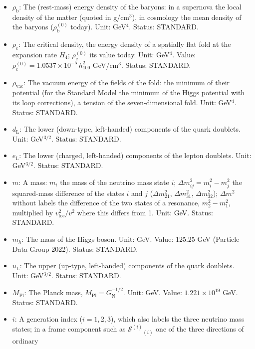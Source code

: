 \documentclass[
  10pt,
]{article}
\begin{document}
\begin{itemize}
  (Planck 2018). Status: DERIVED.
\item
  \(\rho_{\mathrm{b}}\): The (rest-mass) energy density of the baryons:
  in a supernova the local density of the matter (quoted in g/cm\(^3\)),
  in cosmology the mean density of the baryons
  (\(\rho_{\mathrm{b}}^{(0)}\) today). Unit: GeV\(^4\). Status:
  STANDARD.
\item
  \(\rho_{\mathrm{c}}\): The critical density, the energy density of a
  spatially flat fold at the expansion rate \(H_4\);
  \(\rho_{\mathrm{c}}^{(0)}\) its value today. Unit: GeV\(^4\). Value:
  \(\rho_{\mathrm{c}}^{(0)} = 1.0537\times10^{-5}\,h_{100}^2\)
  GeV/cm\(^3\). Status: STANDARD.
\item
  \(\rho_{\mathrm{vac}}\): The vacuum energy of the fields of the fold:
  the minimum of their potential (for the Standard Model the minimum of
  the Higgs potential with its loop corrections), a tension of the
  seven-dimensional fold. Unit: GeV\(^4\). Status: STANDARD.
\item
  \(d_{\mathrm{L}}\): The lower (down-type, left-handed) components of
  the quark doublets. Unit: GeV\(^{3/2}\). Status: STANDARD.
\item
  \(e_{\mathrm{L}}\): The lower (charged, left-handed) components of the
  lepton doublets. Unit: GeV\(^{3/2}\). Status: STANDARD.
\item
  \(m\): A mass: \(m_i\) the mass of the neutrino mass state \(i\);
  \(\Delta m_{ij}^2 = m_i^2 - m_j^2\) the squared-mass difference of the
  states \(i\) and \(j\) (\(\Delta m_{21}^2\), \(\Delta m_{31}^2\),
  \(\Delta m_{32}^2\)); \(\Delta m^2\) without labels the difference of
  the two states of a resonance, \(m_2^2 - m_1^2\), multiplied by
  \(v_{\mathrm{loc}}^2/v^2\) where this differs from 1. Unit: GeV.
  Status: STANDARD.
\item
  \(m_h\): The mass of the Higgs boson. Unit: GeV. Value: 125.25 GeV
  (Particle Data Group 2022). Status: STANDARD.
\item
  \(u_{\mathrm{L}}\): The upper (up-type, left-handed) components of the
  quark doublets. Unit: GeV\(^{3/2}\). Status: STANDARD.
\item
  \(M_{\mathrm{Pl}}\): The Planck mass,
  \(M_{\mathrm{Pl}} = G_{\mathrm{N}}^{-1/2}\). Unit: GeV. Value:
  \(1.221\times10^{19}\) GeV. Status: STANDARD.
\item
  \(i\): A generation index (\(i = 1, 2, 3\)), which also labels the
  three neutrino mass states; in a frame component such as
  \(\mathcal{S}^{(i)}{}_{(i)}\) one of the three directions of ordinary

\end{itemize}
\end{document}
